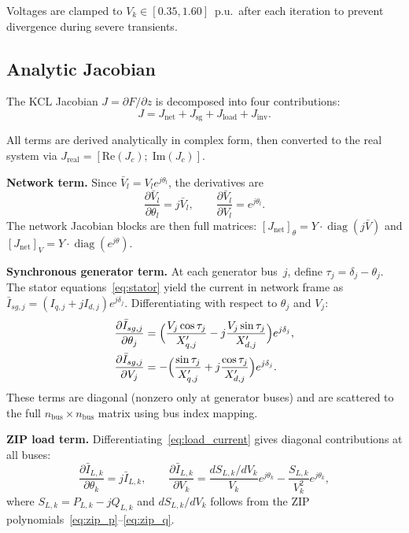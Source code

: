 \documentclass[11pt]{article}
\newcommand{\re}{\mathrm{Re}}
\newcommand{\im}{\mathrm{Im}}
\DeclareMathOperator{\diag}{diag}
\begin{document}
Voltages are clamped to $V_k \in [0.35, 1.60]$~p.u.\ after each
iteration to prevent divergence during severe transients.


\subsection{Analytic Jacobian}
\label{sec:jacobian}

The KCL Jacobian $J = \partial F / \partial z$ is decomposed into
four contributions:
\begin{equation}
  J = J_{\mathrm{net}} + J_{\mathrm{sg}} + J_{\mathrm{load}}
    + J_{\mathrm{inv}}.
  \label{eq:jac_decomp}
\end{equation}

All terms are derived analytically in complex form, then converted to
the real system via $J_{\mathrm{real}} = [\re(J_c);\; \im(J_c)]$.

\textbf{Network term.}  Since
$\bar{V}_l = V_l e^{j\theta_l}$, the derivatives are
\begin{equation}
  \frac{\partial \bar{V}_l}{\partial \theta_l} = j\bar{V}_l, \qquad
  \frac{\partial \bar{V}_l}{\partial V_l} = e^{j\theta_l}.
  \label{eq:dvdz}
\end{equation}
The network Jacobian blocks are then full matrices:
$[J_{\mathrm{net}}]_{\theta} = Y \cdot \diag(j\bar{V})$ and
$[J_{\mathrm{net}}]_{V} = Y \cdot \diag(e^{j\theta})$.

\textbf{Synchronous generator term.}  At each generator bus~$j$,
define $\tau_j = \delta_j - \theta_j$.  The stator
equations~\eqref{eq:stator} yield the current in network frame as
$\bar{I}_{sg,j} = (I_{q,j} + jI_{d,j}) e^{j\delta_j}$.
Differentiating with respect to $\theta_j$ and $V_j$:
\begin{align}
  \frac{\partial \bar{I}_{sg,j}}{\partial \theta_j}
    &= \Bigl(\frac{V_j\cos\tau_j}{X'_{q,j}}
    - j\frac{V_j\sin\tau_j}{X'_{d,j}}\Bigr) e^{j\delta_j},
    \label{eq:disg_dtheta} \\
  \frac{\partial \bar{I}_{sg,j}}{\partial V_j}
    &= -\Bigl(\frac{\sin\tau_j}{X'_{q,j}}
    + j\frac{\cos\tau_j}{X'_{d,j}}\Bigr) e^{j\delta_j}.
    \label{eq:disg_dv}
\end{align}
These terms are diagonal (nonzero only at generator buses) and are
scattered to the full $n_{\mathrm{bus}} \times n_{\mathrm{bus}}$
matrix using bus index mapping.

\textbf{ZIP load term.}  Differentiating~\eqref{eq:load_current}
gives diagonal contributions at all buses:
\begin{equation}
  \frac{\partial \bar{I}_{L,k}}{\partial \theta_k} = j\bar{I}_{L,k},
  \qquad
  \frac{\partial \bar{I}_{L,k}}{\partial V_k}
    = \frac{dS_{L,k}/dV_k}{V_k} e^{j\theta_k}
    - \frac{S_{L,k}}{V_k^2} e^{j\theta_k},
  \label{eq:diload_dz}
\end{equation}
where $S_{L,k} = P_{L,k} - jQ_{L,k}$ and
$dS_{L,k}/dV_k$ follows from the ZIP
polynomials~\eqref{eq:zip_p}--\eqref{eq:zip_q}.
\end{document}
